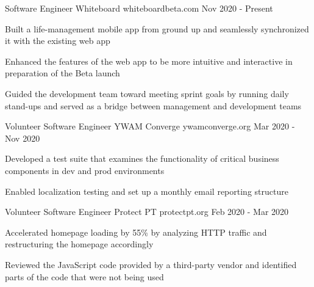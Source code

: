 

\begin{cventries}

\cventry
  {Software Engineer} %
  {Whiteboard} %
  {whiteboardbeta.com} %
  {Nov 2020 - Present} %
  {
    \begin{cvitems} %
      \item {Built a life-management mobile app from ground up and seamlessly synchronized it with the existing web app}
      \item {Enhanced the features of the web app to be more intuitive and interactive in preparation of the Beta launch}
      \item {Guided the development team toward meeting sprint goals by running daily stand-ups and served as a bridge between management and development teams}
    \end{cvitems}
  }

\cventry
  {Volunteer Software Engineer} %
  {YWAM Converge} %
  {ywamconverge.org} %
  {Mar 2020 - Nov 2020} %
  {
    \begin{cvitems} %
      \item {Developed a test suite that examines the functionality of critical business components in dev and prod environments}
      \item {Enabled localization testing and set up a monthly email reporting structure}
    \end{cvitems}
  }

\cventry
  {Volunteer Software Engineer} %
  {Protect PT} %
  {protectpt.org} %
  {Feb 2020 - Mar 2020} %
  {
    \begin{cvitems} %
      \item {Accelerated homepage loading by 55\% by analyzing HTTP traffic and restructuring the homepage accordingly}
      \item {Reviewed the JavaScript code provided by a third-party vendor and identified parts of the code that were not being used}
    \end{cvitems}
  }


\end{cventries}
